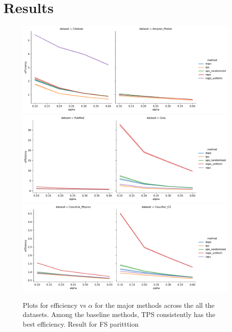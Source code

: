 
\section{Results}


\begin{figure}
    \centering
    \includegraphics[width=\linewidth,alt={Line plots showing method comparisons for small datasets.}]{graphConformal/figures/split/small_datasets_efficiency.png}
    \includegraphics[width=\linewidth,alt={Line plots showing method comparisons for Medium datasets.}]{graphConformal/figures/split/med_1_datasets_efficiency.png}
    \includegraphics[width=\linewidth,alt={Line plots showing method comparisons for large datasets.}]{graphConformal/figures/split/med_2_datasets_efficiency.png}
    \caption{Plots for efficiency vs $\alpha$ for the major methods across the all the datasets. Among the baseline methods, TPS consistently has the best efficiency. Result for FS paritttion}
    \label{fig:fs:conformal:efficiency_vs_alpha}
\end{figure}

